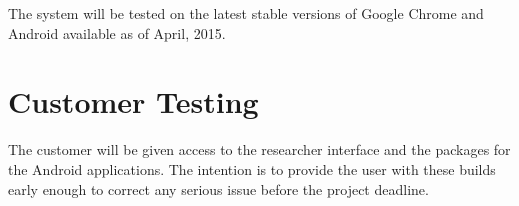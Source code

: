 \documentclass{article}
\begin{document}
The system will be tested on the latest stable versions of Google Chrome and Android available as of April, 2015.

\section{Customer Testing}
The customer will be given access to the researcher interface and the packages for the Android applications. The intention is to provide the user with these builds early enough to correct any serious issue before the project deadline.
\end{document}
